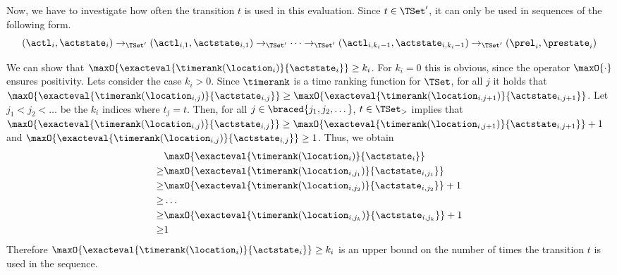 Now, we have to investigate how often the transition $t$ is used in this evaluation.
Since $t \in \TSet'$, it can only be used in sequences of the following form.
\[ (\actl_i, \actstate_i) \rightarrow_{\TSet'} (\actl_{i,1}, \actstate_{i,1}) \rightarrow_{\TSet'} \dots \rightarrow_{\TSet'} (\actl_{i,k_i-1}, \actstate_{i,k_i-1}) \rightarrow_{\TSet'} (\prel_i, \prestate_i) \]

We can show that $\maxO{\exacteval{\timerank(\location_i)}{\actstate_i}} \geq k_i$.
For $k_i = 0$ this is obvious, since the operator $\maxO{\cdot}$ ensures positivity.
Lets consider the case $k_i > 0$.
Since $\timerank$ is a time ranking function for $\TSet$, for all $j$ it holds that $\maxO{\exacteval{\timerank(\location_{i,j})}{\actstate_{i,j}}} \geq \maxO{\exacteval{\timerank(\location_{i,j+1})}{\actstate_{i,j+1}}}$.
Let $j_1 < j_2 < \dots$ be the $k_i$ indices where $t_j = t$.
Then, for all $j \in \braced{j_1, j_2, \dots}$, $t \in \TSet_>$ implies that $\maxO{\exacteval{\timerank(\location_{i,j})}{\actstate_{i,j}}} \geq \maxO{\exacteval{\timerank(\location_{i,j+1})}{\actstate_{i,j+1}}} + 1$ and $\maxO{\exacteval{\timerank(\location_{i,j})}{\actstate_{i,j}}} \geq 1$.
Thus, we obtain
\begin{align*}
  & \maxO{\exacteval{\timerank(\location_i)}{\actstate_i}} \\
  \geq & \maxO{\exacteval{\timerank(\location_{i,j_1})}{\actstate_{i,j_1}}} \\
  \geq & \maxO{\exacteval{\timerank(\location_{i,j_2})}{\actstate_{i,j_2}}} + 1 \\
  \geq & \dots \\
  \geq & \maxO{\exacteval{\timerank(\location_{i,j_k})}{\actstate_{i,j_k}}} + 1 \\
  \geq & 1
\end{align*}
Therefore $\maxO{\exacteval{\timerank(\location_i)}{\actstate_i}} \geq k_i$ is an upper bound on the number of times the transition $t$ is used in the sequence.

